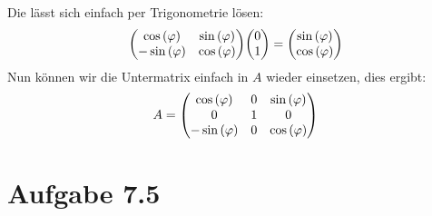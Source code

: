 \documentclass{theozettel}
\begin{document}
Die lässt sich einfach per Trigonometrie lösen:
\begin{align*}
\mqty(\cos\left(\varphi\right) & \sin\left(\varphi\right)\\ -\sin\left(\varphi\right) &\cos\left(\varphi\right))\mqty(0 \\ 1)=\mqty(\sin\left(\varphi\right)\\\cos\left(\varphi\right))
\end{align*}
Nun können wir die Untermatrix einfach in $A$ wieder einsetzen, dies ergibt:
\begin{align*}
A=\mqty(\cos\left(\varphi\right)&0&\sin\left(\varphi\right)\\0&1&0\\-\sin\left(\varphi\right)&0&\cos\left(\varphi\right))
\end{align*}


\section*{Aufgabe 7.5} 
\end{document}

